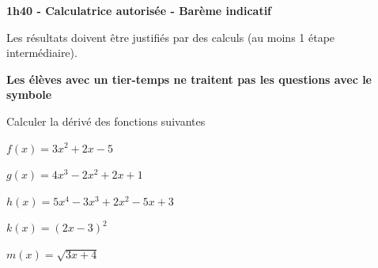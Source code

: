 \documentclass[12pt,a4paper]{article}  %
\begin{document}
\graphicspath{{../images/}}

\begin{center}

\end{center}


\begin{center}\textbf{1h40 - Calculatrice autorisée - Barème indicatif}\end{center}


\begin{center}
Les résultats doivent être justifiés par des calculs (au moins 1 étape intermédiaire).
\end{center}

\begin{center}\textbf{Les élèves avec un tier-temps ne traitent pas les questions avec  le symbole }\end{center}


Calculer la dérivé des fonctions suivantes
\begin{enumMet}
	\item $f(x)=3 x^{2}+2 x-5$ \quad {} \quad {}
	\item {} $g(x)=4 x^{3}-2 x^{2}+2 x+1$ \quad {} \quad {}
	\item $h(x)=5x^4-3x^3+2x^2-5x+3$\quad {} \quad {}
	\item {} $k(x)=(2 x-3)^{2}$ \quad {} \quad {}
	\item $m(x)=\sqrt{3 x+4}$ \quad {} \quad {}
\end{enumMet}
\end{document}
